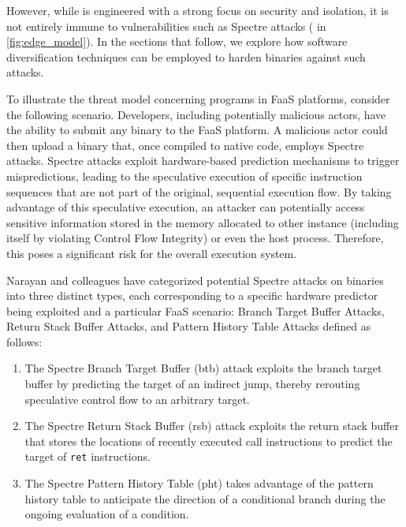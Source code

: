 However, while \Wasm is engineered with a strong focus on security and isolation, it is not entirely immune to vulnerabilities such as Spectre attacks \cite{Spectre,Narayan2021Swivel} ( in \autoref{fig:edge_model}). 
In the sections that follow, we explore how software diversification techniques can be employed to harden \Wasm binaries against such attacks.


To illustrate the threat model concerning \Wasm programs in FaaS platforms, consider the following scenario. 
Developers, including potentially malicious actors, have the ability to submit any \Wasm binary to the FaaS platform. 
A malicious actor could then upload a \Wasm binary that, once compiled to native code, employs Spectre attacks.
Spectre attacks exploit hardware-based prediction mechanisms to trigger mispredictions, leading to the speculative execution of specific instruction sequences that are not part of the original, sequential execution flow. 
By taking advantage of this speculative execution, an attacker can potentially access sensitive information stored in the memory allocated to other \Wasm instance (including itself by violating Control Flow Integrity) or even the host process. 
Therefore, this poses a significant risk for the overall execution system.

Narayan and colleagues \cite{Narayan2021Swivel} have categorized potential Spectre attacks on \Wasm binaries into three distinct types, each corresponding to a specific hardware predictor being exploited and a particular FaaS scenario: Branch Target Buffer Attacks,  Return Stack Buffer Attacks, and Pattern History Table Attacks defined as follows:

\begin{enumerate}
    \item The Spectre Branch Target Buffer (btb) attack exploits the branch target buffer by predicting the target of an indirect jump, thereby rerouting speculative control flow to an arbitrary target.
    \item  The Spectre Return Stack Buffer (rsb) attack exploits the return stack buffer that stores the locations of recently executed call instructions to predict the target of \texttt{ret} instructions.
    \item The Spectre Pattern History Table (pht) takes advantage of the pattern history table to anticipate the direction of a conditional branch during the ongoing evaluation of a condition.
\end{enumerate}


